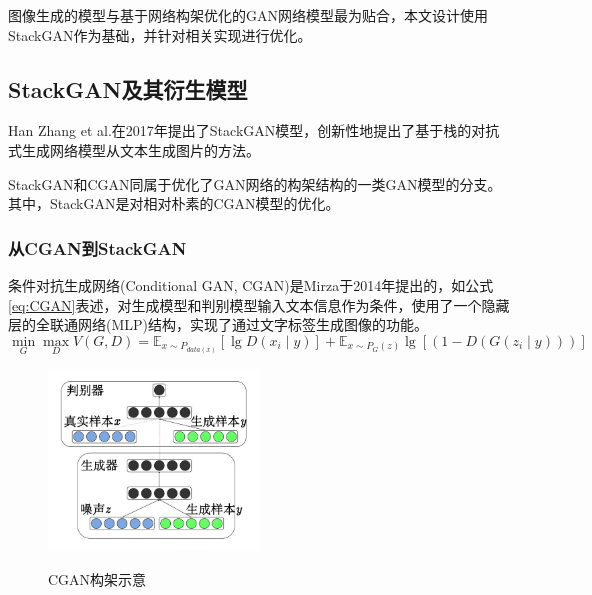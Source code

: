 图像生成的模型与基于网络构架优化的GAN网络模型最为贴合，本文设计使用StackGAN作为基础，并针对相关实现进行优化。

\subsection{StackGAN及其衍生模型}
Han Zhang et al.在2017年提出了StackGAN模型，创新性地提出了基于栈的对抗式生成网络模型从文本生成图片的方法。

StackGAN和CGAN同属于优化了GAN网络的构架结构的一类GAN模型的分支。其中，StackGAN是对相对朴素的CGAN模型的优化。

\subsubsection{从CGAN到StackGAN}
条件对抗生成网络(Conditional GAN, CGAN)是Mirza于2014年提出的，如公式\eqref{eq:CGAN}表述，对生成模型和判别模型输入文本信息作为条件，使用了一个隐藏层的全联通网络(MLP)结构，实现了通过文字标签生成图像的功能。
\begin{equation}
  \min_G\max_DV(G,D)=\mathbb{E}_{x\sim P_{data(x)}}[\lg D(x_i\mid y)]+\mathbb{E}_{x\sim P_G(z)}\lg [(1−D(G(z_i\mid y)))]
  \label{eq:CGAN}
\end{equation}

\begin{figure}[t]
  \centering
  \includegraphics[width=0.5\textwidth]{figures/cgan.jpg}\\
  \caption{CGAN构架示意}
  \label{fig:CGAN}
\end{figure}

